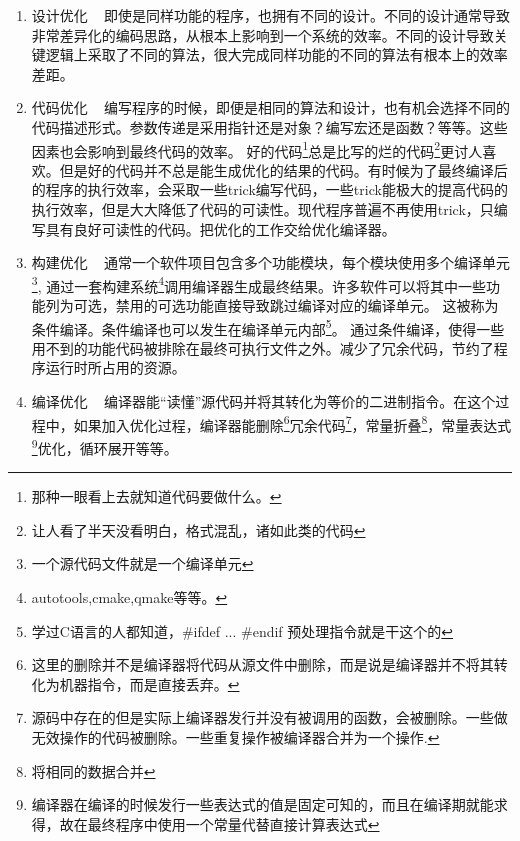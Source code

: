 \documentclass[amstex,twoside]{ctexbook}
\begin{document}
\begin{enumerate}
\item 设计优化	~	即使是同样功能的程序，也拥有不同的设计。不同的设计通常导致非常差异化的编码思路，从根本上影响到一个系统的效率。不同的设计导致关键逻辑上采取了不同的算法，很大完成同样功能的不同的算法有根本上的效率差距。

\item 代码优化	~	编写程序的时候，即便是相同的算法和设计，也有机会选择不同的代码描述形式。参数传递是采用指针还是对象？编写宏还是函数？等等。这些因素也会影响到最终代码的效率。
好的代码\footnote{那种一眼看上去就知道代码要做什么。}总是比写的烂的代码\footnote{让人看了半天没看明白，格式混乱，诸如此类的代码}更讨人喜欢。但是好的代码并不总是能生成优化的结果的代码。有时候为了最终编译后的程序的执行效率，会采取一些trick编写代码，一些trick能极大的提高代码的执行效率，但是大大降低了代码的可读性。现代程序普遍不再使用trick，只编写具有良好可读性的代码。把优化的工作交给优化编译器。

\item 构建优化	~	通常一个软件项目包含多个功能模块，每个模块使用多个编译单元\footnote{一个源代码文件就是一个编译单元}, 通过一套构建系统\footnote{autotools,cmake,qmake等等。}调用编译器生成最终结果。许多软件可以将其中一些功能列为可选，禁用的可选功能直接导致跳过编译对应的编译单元。
这被称为条件编译。条件编译也可以发生在编译单元内部\footnote{学过C语言的人都知道，\#ifdef ... \#endif 预处理指令就是干这个的}。
通过条件编译，使得一些用不到的功能代码被排除在最终可执行文件之外。减少了冗余代码，节约了程序运行时所占用的资源。

\item 编译优化	~	编译器能“读懂”源代码并将其转化为等价的二进制指令。在这个过程中，如果加入优化过程，编译器能删除\footnote{这里的删除并不是编译器将代码从源文件中删除，而是说是编译器并不将其转化为机器指令，而是直接丢弃。}冗余代码\footnote{源码中存在的但是实际上编译器发行并没有被调用的函数，会被删除。一些做无效操作的代码被删除。一些重复操作被编译器合并为一个操作.}，常量折叠\footnote{将相同的数据合并}，常量表达式\footnote{编译器在编译的时候发行一些表达式的值是固定可知的，而且在编译期就能求得，故在最终程序中使用一个常量代替直接计算表达式}优化，循环展开等等。


\end{enumerate}
\end{document}
